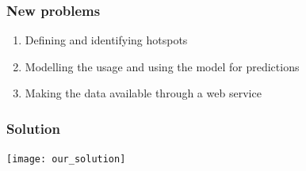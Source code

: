 \begin{frame}
\frametitle{New problems}
\begin{enumerate}
\item Defining and identifying hotspots
\item Modelling the usage and using the model for predictions
\item Making the data available through a web service
\end{enumerate}
\end{frame}

\begin{frame}
\frametitle{Solution}

\centering
\texttt{[image: our\_solution]}

\end{frame}